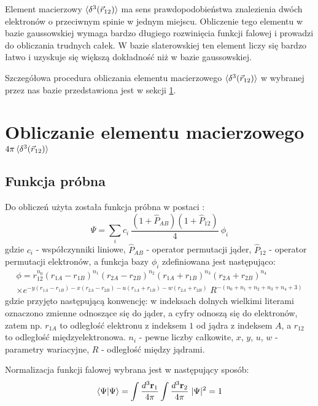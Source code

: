 \documentclass[a4paper,12pt]{article}
\numberwithin{equation}{section}
\numberwithin{table}{section}
\numberwithin{figure}{section}
\begin{document}
Element macierzowy $\braket{\delta^3(\vec{r}_{12})}$ ma sens prawdopodobieństwa znalezienia dwóch elektronów o przeciwnym spinie w jednym miejscu. Obliczenie tego elementu w bazie gaussowskiej wymaga bardzo długiego rozwinięcia funkcji falowej i prowadzi do obliczania trudnych całek. W bazie slaterowskiej ten element liczy się bardzo łatwo i uzyskuje się większą dokładność niż w bazie gaussowskiej.

Szczegółowa procedura obliczania elementu macierzowego $\braket{\delta^3(\vec{r}_{12})}$ w wybranej przez nas bazie przedstawiona jest w sekcji \ref{sec:delta}.

%
%
\newpage
\section{Obliczanie elementu macierzowego $4\pi\braket{\delta^3(\vec{r}_{12})}$} \label{sec:delta}
\subsection{Funkcja próbna} \label{sec:wf}
Do obliczeń użyta została funkcja próbna w postaci \cite{pachucki2010}:
\begin{equation}\label{eq:psi}
	\Psi = \sum_i c_i \: \frac{(1+\hat{P}_{AB})(1+\hat{P}_{12})}{4}\: \phi_i
\end{equation}
gdzie $c_i$ - współczynniki liniowe, $\hat{P}_{AB}$ - operator permutacji jąder, $\hat{P}_{12}$ - operator permutacji elektronów, a funkcja bazy $\phi_i$ zdefiniowana jest następująco:
\begin{multline}
	\phi =  r_{12}^{n_0} (r_{1A}-r_{1B})^{n_1} (r_{2A}-r_{2B})^{n_2} (r_{1A}+r_{1B})^{n_3} (r_{2A}+r_{2B})^{n_4} \\
	\times{} e^{-y(r_{1A}-r_{1B})-x (r_{2A}-r_{2B}) -u(r_{1A}+r_{1B}) -w(r_{2A}+r_{2B})} \; R^{-(n_0+n_1+n_2+n_3+n_4+3)}
\end{multline}
gdzie przyjęto następującą konwencję: w indeksach dolnych wielkimi literami oznaczono zmienne odnoszące się do jąder, a cyfry odnoszą się do elektronów, zatem np. $r_{1A}$ to odległość elektronu z indeksem $1$ od jądra z indeksem $A$, a $r_{12}$ to odległość międzyelektronowa. $n_i$ - pewne liczby całkowite, $x$, $y$, $u$, $w$ - parametry wariacyjne, $R$ - odległość między jądrami.

Normalizacja funkcji falowej wybrana jest w następujący sposób:
\begin{equation} \label{eq:norm}
\braket{\Psi|\Psi} = \int \frac{d^3\mathbf{r}_1}{4\pi}\int \frac{d^3\mathbf{r}_2}{4\pi} \;|\Psi|^2 = 1
\end{equation}
\end{document}
